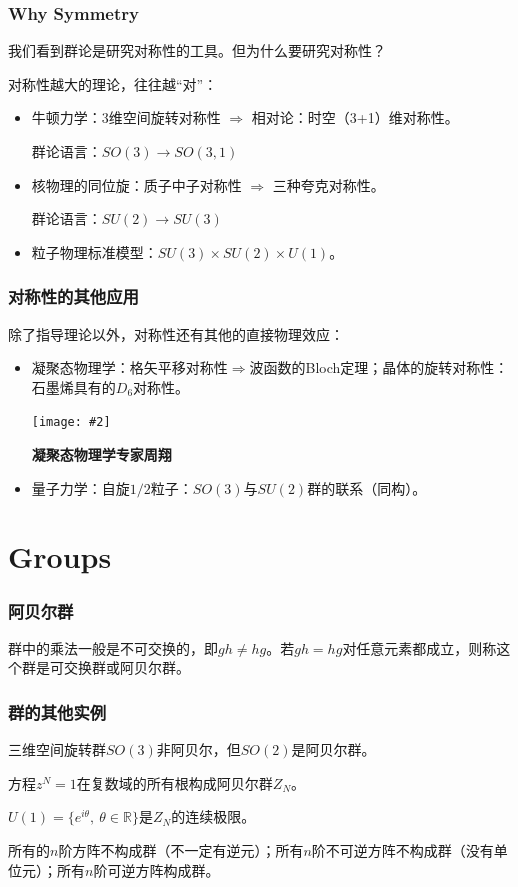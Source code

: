 \documentclass[CJK]{beamer}
\newcommand{\reals}{\mathbb{R}}
\newcommand{\cpic}[2]{
\begin{center}
\texttt{[image: \#2]}
\end{center}
}
\begin{document}
\begin{frame}
\frametitle{\bch Why Symmetry \ech}
\bch
我们看到群论是研究对称性的工具。但为什么要研究对称性？
\par
对称性越大的理论，往往越“对”：
\begin{itemize}
\item 牛顿力学：3维空间旋转对称性 $\Rightarrow$ 相对论：时空（3+1）维对称性。
\par
群论语言：$SO(3) \to SO(3,1)$
\item 核物理的同位旋：质子中子对称性 $\Rightarrow$ 三种夸克对称性。
\par
群论语言：$SU(2) \to SU(3)$
\item 粒子物理标准模型：$SU(3) \times SU(2) \times U(1)$。
\end{itemize}

\ech
\end{frame}

\begin{frame}
\frametitle{\bch 对称性的其他应用 \ech}
\bch
除了指导理论以外，对称性还有其他的直接物理效应：

\begin{itemize}
\item 凝聚态物理学：格矢平移对称性$\Rightarrow$波函数的Bloch定理；晶体的旋转对称性：石墨烯具有的$D_6$对称性。
\cpic{0.2}{zx}
\begin{center}
{\small \bf 凝聚态物理学专家周翔}
\end{center}
\item 量子力学：自旋$1/2$粒子：$SO(3)$与$SU(2)$群的联系（同构）。
\end{itemize}

\ech
\end{frame}

\section{Groups}
\begin{frame}
\frametitle{\bch 阿贝尔群 \ech}
\bch
群中的乘法一般是不可交换的，即$gh \not= hg$。若$gh = hg$对任意元素都成立，则称这个群是可交换群或阿贝尔群。

\ech
\end{frame}

\begin{frame}
\frametitle{\bch 群的其他实例 \ech}
\bch
三维空间旋转群$SO(3)$非阿贝尔，但$SO(2)$是阿贝尔群。
\par
方程$z^N = 1$在复数域的所有根构成阿贝尔群$Z_N$。
\par
$U(1) = \{ e^{i \theta},\ \theta \in \reals\}$是$Z_N$的连续极限。
\par
所有的$n$阶方阵不构成群（不一定有逆元）；所有$n$阶不可逆方阵不构成群（没有单位元）；所有$n$阶可逆方阵构成群。

\ech
\end{frame}
\end{document}
